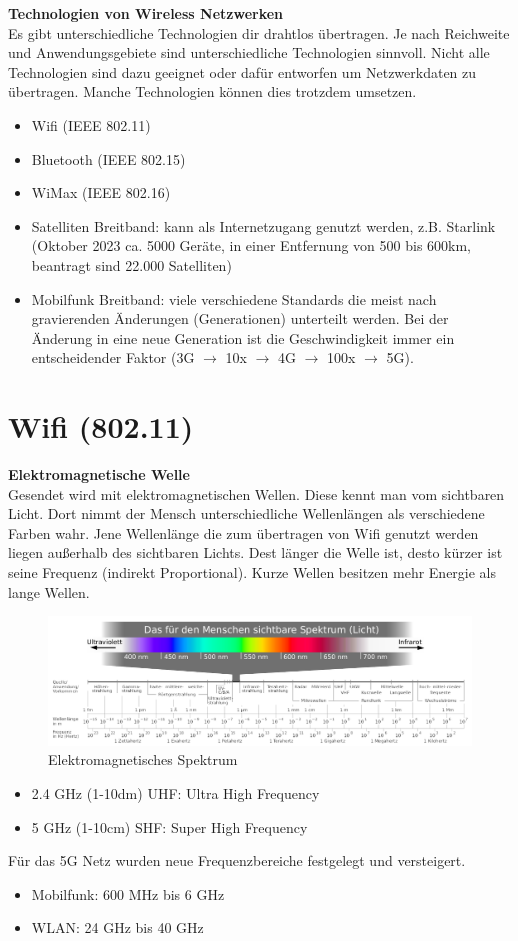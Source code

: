 \textbf{Technologien von Wireless Netzwerken} \\
Es gibt unterschiedliche Technologien dir drahtlos übertragen. Je nach Reichweite und Anwendungsgebiete sind unterschiedliche Technologien sinnvoll. Nicht alle Technologien sind dazu geeignet oder dafür entworfen um Netzwerkdaten zu übertragen. Manche Technologien können dies trotzdem umsetzen.
\begin{itemize}
	\item Wifi (IEEE 802.11)
	\item Bluetooth (IEEE 802.15)
	\item WiMax (IEEE 802.16)
	\item Satelliten Breitband: kann als Internetzugang genutzt werden, z.B. Starlink (Oktober 2023 ca. 5000 Geräte, in einer Entfernung von 500 bis 600km, beantragt sind 22.000 Satelliten)
	\item Mobilfunk Breitband: viele verschiedene Standards die meist nach gravierenden Änderungen (Generationen) unterteilt werden. Bei der Änderung in eine neue Generation ist die Geschwindigkeit immer ein entscheidender Faktor (3G $\rightarrow$ 10x $\rightarrow$ 4G $\rightarrow$ 100x $\rightarrow$ 5G).
\end{itemize}

\section{Wifi (802.11)}
\textbf{Elektromagnetische Welle} \\
Gesendet wird mit elektromagnetischen Wellen. Diese kennt man vom sichtbaren Licht. Dort nimmt der Mensch unterschiedliche Wellenlängen als verschiedene Farben wahr. Jene Wellenlänge die zum übertragen von Wifi genutzt werden liegen außerhalb des sichtbaren Lichts. Dest länger die Welle ist, desto kürzer ist seine Frequenz (indirekt Proportional). Kurze Wellen besitzen mehr Energie als lange Wellen.
\begin{figure}[H]
	\centering
	\includegraphics[width=1.0\linewidth]{figures/elektro_spektrum.png}
	\caption{Elektromagnetisches Spektrum}
\end{figure}
\begin{itemize}
	\item 2.4 GHz (1-10dm) UHF: Ultra High Frequency
	\item 5 GHz (1-10cm) SHF: Super High Frequency
\end{itemize}
Für das 5G Netz wurden neue Frequenzbereiche festgelegt und versteigert.
\begin{itemize}
	\item Mobilfunk: 600 MHz bis 6 GHz
	\item WLAN: 24 GHz bis 40 GHz
\end{itemize}

